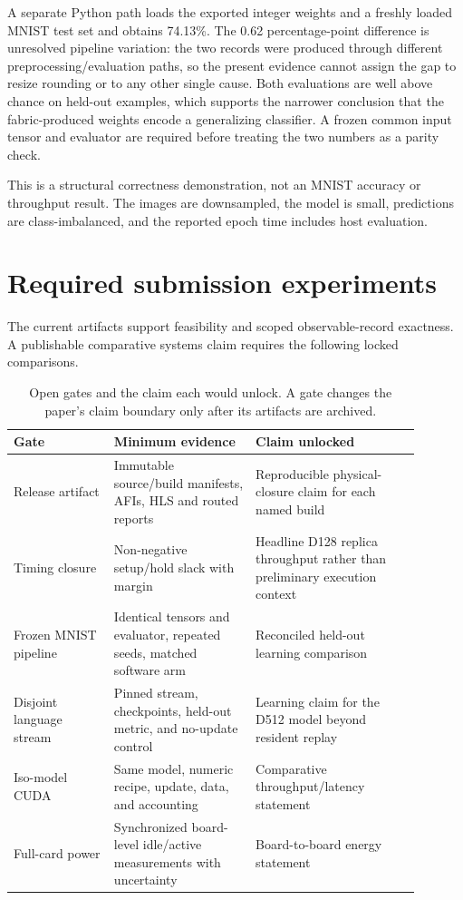 \documentclass[10pt]{article}
\begin{document}
A separate Python path loads the exported integer weights and a freshly loaded
MNIST test set and obtains 74.13\%.  The 0.62 percentage-point difference is
unresolved pipeline variation: the two records were produced through different
preprocessing/evaluation paths, so the present evidence cannot assign the gap
to resize rounding or to any other single cause.  Both evaluations are well
above chance on held-out examples, which supports the narrower conclusion that
the fabric-produced weights encode a generalizing classifier.  A frozen common
input tensor and evaluator are required before treating the two numbers as a
parity check.

This is a structural correctness demonstration, not an MNIST accuracy or
throughput result.  The images are downsampled, the model is small, predictions
are class-imbalanced, and the reported epoch time includes host evaluation.

\section{Required submission experiments}

The current artifacts support feasibility and scoped observable-record
exactness.  A publishable comparative systems claim requires the following
locked comparisons.

\begin{table}[t]
\centering
\caption{Open gates and the claim each would unlock.  A gate changes the paper's
claim boundary only after its artifacts are archived.}
\label{tab:open-gates}
\small
\begin{tabular}{p{0.22\linewidth}p{0.31\linewidth}p{0.36\linewidth}}
\toprule
Gate & Minimum evidence & Claim unlocked \\
\midrule
Release artifact & Immutable source/build manifests, AFIs, HLS and routed
reports & Reproducible physical-closure claim for each named build \\
Timing closure & Non-negative setup/hold slack with margin & Headline D128
replica throughput rather than preliminary execution context \\
Frozen MNIST pipeline & Identical tensors and evaluator, repeated seeds,
matched software arm & Reconciled held-out learning comparison \\
Disjoint language stream & Pinned stream, checkpoints, held-out metric, and
no-update control & Learning claim for the D512 model beyond resident replay \\
Iso-model CUDA & Same model, numeric recipe, update, data, and accounting &
Comparative throughput/latency statement \\
Full-card power & Synchronized board-level idle/active measurements with
uncertainty & Board-to-board energy statement \\
\bottomrule
\end{tabular}
\end{table}
\end{document}
